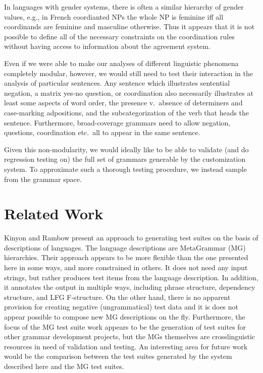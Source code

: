 \documentclass[11pt]{article}
\begin{document}
%
In languages with gender systems, there is often a similar hierarchy
of gender values, e.g., in French coordianted NPs the whole NP is feminine
iff all coordinands are feminine and masculine otherwise.  Thus
it appears that it is not possible to define all of the necessary
constraints on the coordination rules without having access to information
about the agreement system.  

Even if we were able to make our analyses of different linguistic
phenomena completely modular, however, we would still need to test
their interaction in the analysis of particular sentences.
Any sentence which illustrates sentential negation, a matrix yes-no
question, or coordination also necessarily illustrates at least some
aspects of word order, the presence v.\ absence of determiners and
case-marking adpositions, and the subcategorization of the verb that
heads the sentence.  Furthermore, broad-coverage grammars need to
allow negation, questions, coordination etc.\ all to appear in the
same sentence.

Given this non-modularity, we would ideally like to be able to
validate (and do regression testing on) the full set of grammars
generable by the customization system.  To approximate such a thorough
testing procedure, we instead sample from the grammar space.

\section{Related Work}
\label{rw}
Kinyon and Rambow  present an approach to
generating test suites on the basis of descriptions of languages.  The
language descriptions are MetaGrammar (MG) hierarchies. Their approach
appears to be more flexible than the one presented here in some ways,
and more constrained in others.  It does not need any input strings,
but rather produces test items from the language description. In
addition, it annotates the output in multiple ways, including phrase
structure, dependency structure, and LFG F-structure.  On the other
hand, there is no apparent provision for creating negative
(ungrammatical) test data and it is does not appear possible to
compose new MG descriptions on the fly.  Furthermore, the focus of the
MG test suite work appears to be the generation of test suites for
other grammar development projects, but the MGs themselves are
crosslinguistic resources in need of validation and testing. An
interesting area for future work would be the comparison between the
test suites generated by the system described here and the MG test
suites.
\end{document}
